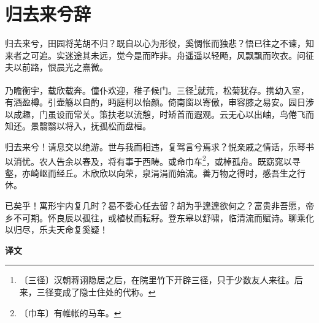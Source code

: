 \documentclass[12pt,UTF-8,openany,a4]{ctexbook}
\begin{document}
\chapter{归去来兮辞}

\begin{large}
    
    归去来兮，田园将芜胡不归？既自以心为形役，奚惆怅而独悲？悟已往之不谏，知来者之可追。实迷途其未远，觉今是而昨非。舟遥遥以轻飏，风飘飘而吹衣。问征夫以前路，恨晨光之熹微。
    
    乃瞻衡宇，载欣载奔。僮仆欢迎，稚子候门。三径\footnote{〔三径〕\yiwen 汉朝蒋诩隐居之后，在院里竹下开辟三径，只于少数友人来往。后来，三径变成了隐士住处的代称。}就荒，松菊犹存。携幼入室，有酒盈樽。引壶觞以自酌，眄庭柯以怡颜。倚南窗以寄傲，审容膝之易安。园日涉以成趣，门虽设而常关。策扶老以流憩，时矫首而遐观。云无心以出岫，鸟倦飞而知还。景翳翳以将入，抚孤松而盘桓。
    
    归去来兮！请息交以绝游。世与我而相违，复驾言兮焉求？悦亲戚之情话，乐琴书以消忧。农人告余以春及，将有事于西畴。或命巾车\footnote{〔巾车〕\yiwen 有帷帐的马车。}，或棹孤舟。既窈窕以寻壑，亦崎岖而经丘。木欣欣以向荣，泉涓涓而始流。善万物之得时，感吾生之行休。
    
    已矣乎！寓形宇内复几时？曷不委心任去留？胡为乎遑遑欲何之？富贵非吾愿，帝乡不可期。怀良辰以孤往，或植杖而耘耔。登东皋以舒啸，临清流而赋诗。聊乘化以归尽，乐夫天命复奚疑！
\end{large}


\newpage

\begin{Large}
    \noindent\textbf{译文}
\end{Large}


\vspace{1em}
\end{document}
